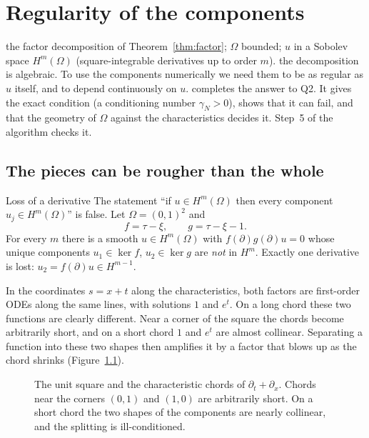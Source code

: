 \chapter{Regularity of the components}\label{ch:regular}
\chapterbrief
{the factor decomposition of Theorem~\ref{thm:factor}; $\Omega$ bounded; $u$ in a Sobolev space $H^m(\Omega)$ (square-integrable derivatives up to order $m$).}
{the decomposition is algebraic. To use the components numerically we need them to be as regular as $u$ itself, and to depend continuously on $u$.}
{completes the answer to Q2. It gives the exact condition (a conditioning number $\gamma_N>0$), shows that it can fail, and that the geometry of $\Omega$ against the characteristics decides it. Step~5 of the algorithm checks it.}

\section{The pieces can be rougher than the whole}

\begin{falsebox}{Loss of a derivative  \falsest}\label{cex:loss}
The statement ``if $u\in H^m(\Omega)$ then every component $u_j\in H^m(\Omega)$'' is false. Let $\Omega=(0,1)^2$ and
\[
f=\tau-\xi,\qquad g=\tau-\xi-1 .
\]
For every $m$ there is a smooth $u\in H^m(\Omega)$ with $f(\partial)g(\partial)u=0$ whose unique components $u_1\in\ker f$, $u_2\in\ker g$ are \emph{not} in $H^m$. Exactly one derivative is lost: $u_2=f(\partial)u\in H^{m-1}$.

\end{falsebox}

\begin{intuition}
In the coordinates $s=x+t$ along the characteristics, both factors are first-order ODEs along the same lines, with solutions $1$ and $e^{t}$. On a long chord these two functions are clearly different. Near a corner of the square the chords become arbitrarily short, and on a short chord $1$ and $e^{t}$ are almost collinear. Separating a function into these two shapes then amplifies it by a factor that blows up as the chord shrinks (Figure~\ref{fig:chords}).
\end{intuition}

\begin{figure}[!htb]
\centering
{}
\caption{The unit square and the characteristic chords of $\partial_t+\partial_x$. Chords near the corners $(0,1)$ and $(1,0)$ are arbitrarily short. On a short chord the two shapes of the components are nearly collinear, and the splitting is ill-conditioned.}\label{fig:chords}
\end{figure}

